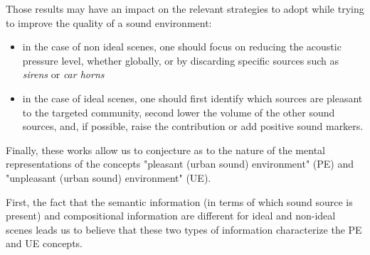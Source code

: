 \documentclass[preprint,12pt]{elsarticle}
\newcommand{\ie}{\emph{i.\,e.}}
\newcommand{\eg}{\emph{e.\,g.}}
\begin{document}
Those results may have an impact on the relevant strategies to adopt while trying to improve the quality of a sound environment:


\begin{itemize}
\item in the case of non ideal scenes, one should focus on reducing the acoustic pressure level, whether globally, or by discarding specific sources such as \emph{sirens} or \emph{car horns}
\item in the case of ideal scenes, one should first identify which sources are pleasant to the targeted community, second lower the volume of the other sound sources, and, if possible, raise the contribution or add positive sound markers.
\end{itemize}


Finally, these works allow us to conjecture as to the nature of the mental representations of the concepts "pleasant (urban sound) environment" (PE) and "unpleasant (urban sound) environment" (UE).


First, the fact that the semantic information (in terms of which sound source is present) and compositional information are different for ideal and non-ideal scenes leads us to believe that these two types of information characterize the PE and UE concepts.

\end{document}
